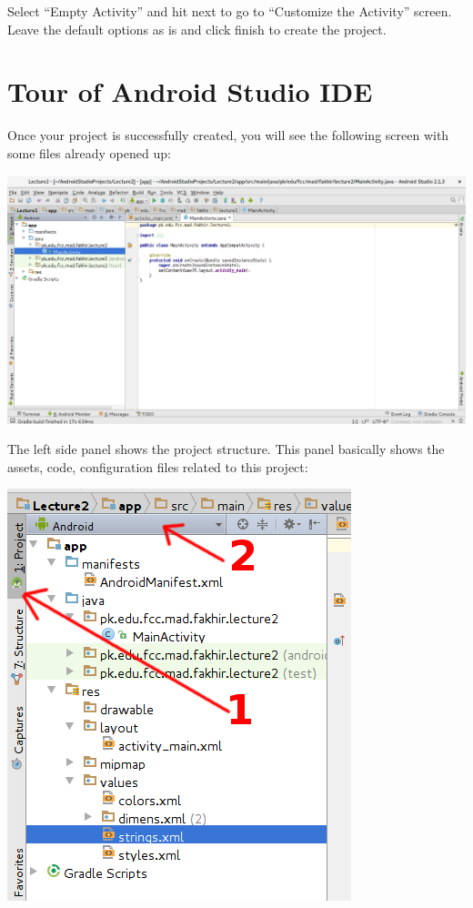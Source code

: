 Select ``Empty Activity'' and hit next to go to ``Customize the Activity'' screen. Leave the default options as is and click finish to create the project.

\section{Tour of Android Studio IDE}
Once your project is successfully created, you will see the following screen with some files already opened up:

\begin{center}
	\includegraphics[scale=0.2]{chapters/ch02/images/5_android_studio}
\end{center}

The left side panel shows the project structure. This panel basically shows the assets, code, configuration files related to this project:

\begin{center}
	\includegraphics[scale=0.3]{chapters/ch02/images/6_project_panel}
\end{center}

